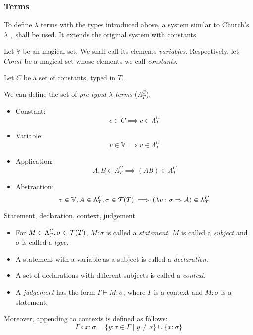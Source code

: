 \documentclass[main.tex]{subfiles}
\begin{document}
\subsubsection{Terms}
To define $\lambda$ terms with the types introduced above, a system similar
to Church's $\lambda_\rightarrow$ \cite[chap.~2.4]{ttfp} shall be used. It
extends the original system with constants.

Let $\mathbb{V}$ be an magical set. We shall call its
elements \emph{variables}.
Respectively, let $Const$ be a magical set whose elements
we call \emph{constants}.

\begin{defn}
    Let $C$ be a set of constants, typed in $T$.

    We can define the set of
    \emph{pre-typed $\lambda$-terms} ($\Lambda_T^C$).

    \begin{itemize}
        \item Constant:    \[ c \in C \implies c \in \Lambda_T^C \]
        \item Variable:    \[ v \in \mathbb{V} \implies v \in \Lambda_T^C \]
        \item Application: \[ A, B \in \Lambda_T^C \implies (AB) \in \Lambda_T^C \]
        \item Abstraction: \[ v \in \mathbb{V}, A \in \Lambda_T^C, \sigma \in \mathcal{T}( T )
                \implies (\lambda v : \sigma \Rightarrow A) \in \Lambda_T^C \]
    \end{itemize}
\end{defn}

\begin{defn}
    Statement, declaration, context, judgement \cite[chap.~2.4]{ttfp}
    \begin{itemize}
        \item For $M \in \Lambda_T^C, \sigma \in \mathcal{T}( T )$, $M : \sigma$ is called
            a \emph{statement}. $M$ is called a \emph{subject} and $\sigma$
            is called a \emph{type}.
        \item A statement with a variable as a subject is called a \emph{declaration}.
        \item A set of declarations with different subjects is called a \emph{context}.
        \item A \emph{judgement} has the form $\Gamma \vdash M: \sigma$, where
            $\Gamma$ is a context and $M: \sigma$ is a statement.
    \end{itemize}

    Moreover, appending to contexts is defined as follows:
    \[ \Gamma \circ x : \sigma = \{ y : \tau \in \Gamma \mid y \neq x \}
       \cup \{ x : \sigma \} \]
\end{defn}
\end{document}
